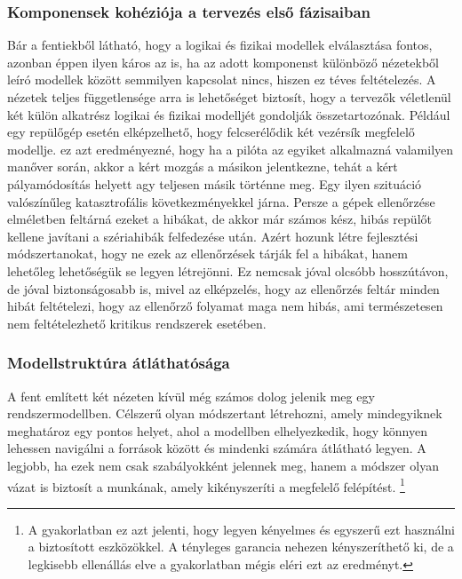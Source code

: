         \subsubsection{Komponensek kohéziója a tervezés első fázisaiban}
        Bár a fentiekből látható, hogy a logikai és fizikai modellek elválasztása fontos, azonban éppen ilyen káros az is, ha az adott komponenst különböző nézetekből leíró modellek között semmilyen kapcsolat nincs, hiszen ez téves feltételezés.
        A nézetek teljes függetlensége arra is lehetőséget biztosít, hogy a tervezők véletlenül két külön alkatrész logikai és fizikai modelljét gondolják összetartozónak.
        Például egy repülőgép esetén elképzelhető, hogy felcserélődik két vezérsík megfelelő modellje. ez azt eredményezné, hogy ha a pilóta az egyiket alkalmazná valamilyen manőver során, akkor a kért mozgás a másikon jelentkezne, tehát a kért pályamódosítás helyett agy teljesen másik történne meg.
        Egy ilyen szituáció valószínűleg katasztrofális következményekkel járna.
        Persze a gépek ellenőrzése elméletben feltárná ezeket a hibákat, de akkor már számos kész, hibás repülőt kellene javítani a szériahibák felfedezése után.
        Azért hozunk létre fejlesztési módszertanokat, hogy ne ezek az ellenőrzések tárják fel a hibákat, hanem lehetőleg lehetőségük se legyen létrejönni.
        Ez nemcsak jóval olcsóbb hosszútávon, de jóval biztonságosabb is, mivel az elképzelés, hogy az ellenőrzés feltár minden hibát feltételezi, hogy az ellenőrző folyamat maga nem hibás, ami természetesen nem feltételezhető kritikus rendszerek esetében.

        \subsubsection{Modellstruktúra átláthatósága}
        A fent említett két nézeten kívül még számos dolog jelenik meg egy rendszermodellben.
        Célszerű olyan módszertant létrehozni, amely mindegyiknek meghatároz egy pontos helyet, ahol a modellben elhelyezkedik, hogy könnyen lehessen navigálni a források között és mindenki számára átlátható legyen.
        A legjobb, ha ezek nem csak szabályokként jelennek meg, hanem a módszer olyan vázat is biztosít a munkának, amely kikényszeríti a megfelelő felépítést.
        \footnote{A gyakorlatban ez azt jelenti, hogy legyen kényelmes és egyszerű ezt használni a biztosított eszközökkel. A tényleges garancia nehezen kényszeríthető ki, de a legkisebb ellenállás elve a gyakorlatban mégis eléri ezt az eredményt.}

